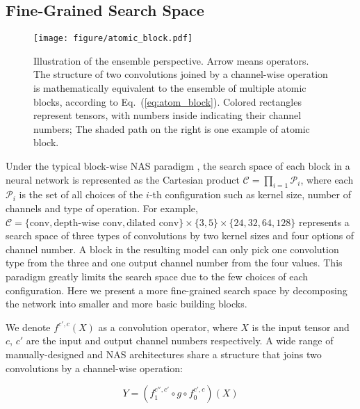 \documentclass{article} \usepackage{iclr2020_conference,times}
\begin{document}
\subsection{Fine-Grained Search Space}
\label{sec:fine_grained_search_space}

\begin{figure}[btp]
    \centering
    \texttt{[image: figure/atomic\_block.pdf]}
    \caption{Illustration of the ensemble perspective. Arrow means operators. The structure of two convolutions joined by a channel-wise operation is mathematically equivalent to the ensemble of multiple atomic blocks, according to Eq.~(\ref{eq:atom_block}). Colored rectangles represent tensors, with numbers inside indicating their channel numbers; The shaded path on the right is one example of atomic block.} \label{fig:rethink_inverted_residual}
\end{figure}
Under the typical block-wise NAS paradigm \citep{tan2019mnasnet,tan2019mixnet}, the search space of each block in a neural network is represented as the Cartesian product $\mathcal{C} = \prod_{i=1}\mathcal{P}_i$, where each $\mathcal{P}_i$ is the set of all choices of the $i$-th configuration such as kernel size, number of channels and type of operation. For example, $\mathcal{C}=\{\mbox{conv}, \mbox{depth-wise conv}, \mbox{dilated conv}\}\times \{3, 5\}\times\{24, 32, 64, 128\}$ represents a search space of three types of convolutions by two kernel sizes and four options of channel number. A block in the resulting model can only pick one convolution type from the three and one output channel number from the four values. This paradigm greatly limits the search space due to the few choices of each configuration. Here we present a more fine-grained search space by decomposing the network into smaller and more basic building blocks.


We denote $f^{c',c}(X)$ as a convolution operator, where $X$ is the input tensor and $c$, $c'$ are the input and output channel numbers respectively. A wide range of manually-designed and NAS architectures share a structure that joins two convolutions by a channel-wise operation:

\begin{equation}
    Y = \left(f_1^{c'',c'} \circ g \circ f_0^{c',c}\right)(X) \label{eq:unit}
\end{equation}
\end{document}

